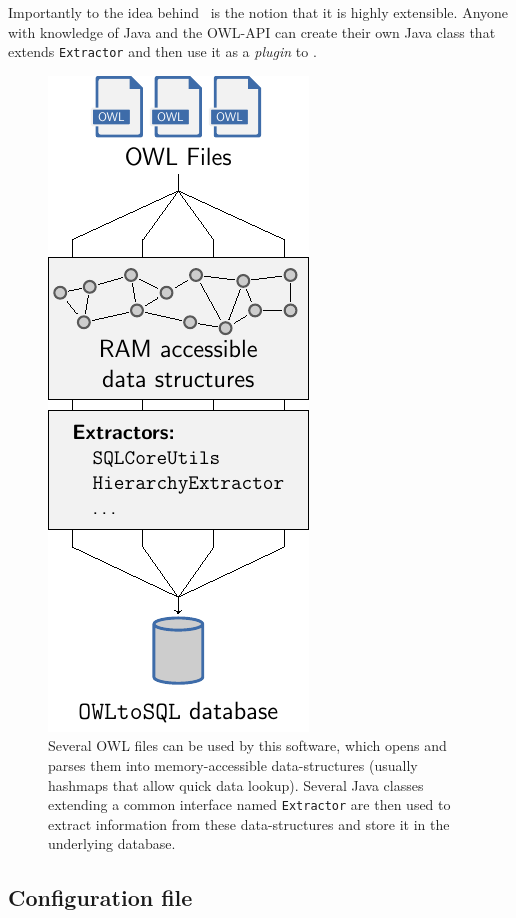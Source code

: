 Importantly to the idea behind \owlsql\ is the notion that it is highly extensible. Anyone with knowledge of Java and the OWL-API can create their own Java class that extends \texttt{Extractor} and then use it as a \emph{plugin} to \owlsql.

\begin{figure}
    \centering
    \includegraphics{images/owlsql.pdf}
    \caption[Operation model of \owlsql]{Several OWL files can be used by this software, which opens and parses them into memory-accessible data-structures (usually hashmaps that allow quick data lookup). Several Java classes extending a common interface named \texttt{Extractor} are then used to extract information from these data-structures and store it in the underlying database.}
    \label{fig:model}
\end{figure}


\subsection{Configuration file} \label{sub:owlsql/config}

